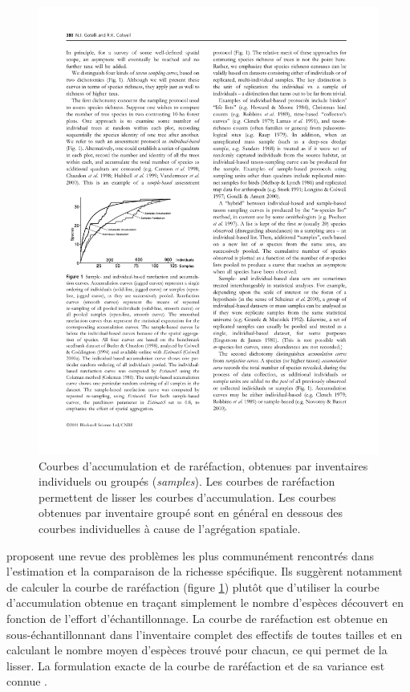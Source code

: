 \documentclass[
  11pt,
  french,
  a4paper,
  extrafontsizes,onecolumn,openright
  ]{memoir}
\begin{document}
\begin{figure}

{\centering \includegraphics[width=0.8\linewidth]{images/Gotelli2001} 

}

\caption{Courbes d'accumulation et de raréfaction, obtenues par inventaires individuels ou groupés (\emph{samples}). Les courbes de raréfaction permettent de lisser les courbes d'accumulation. Les courbes obtenues par inventaire groupé sont en général en dessous des courbes individuelles à cause de l'agrégation spatiale.}\label{fig:Gotelli2001}
\end{figure}

\normalsize

\textcite{Gotelli2001} proposent une revue des problèmes les plus communément rencontrés dans l'estimation et la comparaison de la richesse spécifique.
Ils suggèrent notamment de calculer la courbe de raréfaction (figure \ref{fig:Gotelli2001}) plutôt que d'utiliser la courbe d'accumulation obtenue en traçant simplement le nombre d'espèces découvert en fonction de l'effort d'échantillonnage.
La courbe de raréfaction est obtenue en sous-échantillonnant dans l'inventaire complet des effectifs de toutes tailles et en calculant le nombre moyen d'espèces trouvé pour chacun, ce qui permet de la lisser.
La formulation exacte de la courbe de raréfaction et de sa variance est connue \autocite{Ugland2003}.
\end{document}

